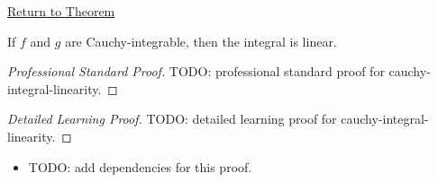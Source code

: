 \newpage
{}
\label{prf:cauchy-integral-linearity}
\begin{remark*}[Return]\hyperref[thm:cauchy-integral-linearity]{Return to Theorem}\end{remark*}

\begin{theorem*}
If \(f\) and \(g\) are Cauchy-integrable, then the integral is linear.
\end{theorem*}

\begin{proof}[Professional Standard Proof]
\LRAProofBodyStart
TODO: professional standard proof for cauchy-integral-linearity.
\end{proof}

\begin{proof}[Detailed Learning Proof]
\LRAProofBodyStart
TODO: detailed learning proof for cauchy-integral-linearity.
\end{proof}

\begin{remark*}
\end{remark*}

\begin{dependencies}
\begin{itemize}
  \item TODO: add dependencies for this proof.
\end{itemize}
\end{dependencies}

\clearpage
